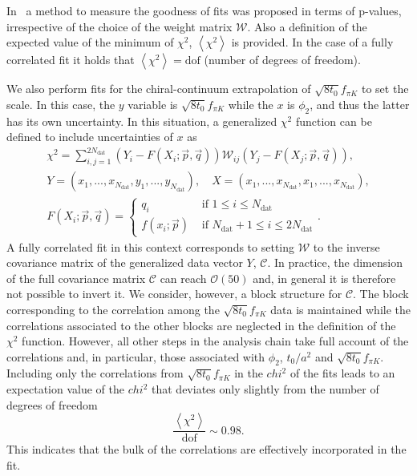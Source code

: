 In~\citep{Bruno:2022mfy} a method to measure the goodness of fits was proposed in terms of p-values, irrespective of the choice of the weight matrix $\mathcal{W}$. Also a definition of the expected value of the minimum of $\chi^2$, $\left<\chi^2\right>$ is provided. In the case of a fully correlated fit it holds that $\left<\chi^2\right>={\textrm{dof}}$ (number of degrees of freedom).

We also perform fits for the chiral-continuum extrapolation of $\sqrt{8t_0}f_{\pi K}$ to set the scale. In this case, the $y$ variable is $\sqrt{8t_0}f_{\pi K}$ while the $x$ is $\phi_2$, and thus the latter has its own uncertainty. In this situation, a generalized $\chi^2$ function can be defined to include uncertainties of $x$ as
\begin{gather}
\label{apex_chisq:eq:chisq_generalized}
\chi^2=\sum_{i,j=1}^{2N_{\textrm{dat}}}\left(Y_i-F(X_i;\vec{p},\vec{q})\right)\mathcal{W}_{ij}\left(Y_j-F(X_j;\vec{p},\vec{q})\right), \\
Y=(x_1,...,x_{N_{\textrm{dat}}},y_1,...,y_{N_{\textrm{dat}}}), \quad
X=(x_1,...,x_{N_{\textrm{dat}}},x_1,...,x_{N_{\textrm{dat}}}), \\
F(X_i;\vec{p},\vec{q})=\left\{\begin{matrix}
q_i & \textrm{ if $1\leq i\leq N_{\textrm{dat}}$} \\ 
f(x_i;\vec{p}) & \textrm{ if $N_{\textrm{dat}}+1\leq i\leq 2N_{\textrm{dat}}$}
\end{matrix}\right..
\end{gather}
A fully correlated fit in this context corresponds to setting $\mathcal{W}$ to the inverse covariance matrix of the generalized data vector $Y$, $\mathcal{C}$. In practice, the dimension of the full covariance matrix $\mathcal{C}$ can reach $\mathcal{O}(50)$ and, in general it is therefore not possible to invert it. We consider, however, a block structure for $\mathcal{C}$. The block corresponding to the correlation among  the $\sqrt{8t_0}f_{\pi K}$ data is maintained while the correlations associated to the other blocks are neglected in the definition of the $\chi^2$ function. However, all other steps in the analysis chain take full account  of the correlations and, in particular, those associated with $\phi_2$, $t_0/a^2$ and $\sqrt{8t_0}f_{\pi K}$. Including only the correlations from $\sqrt{8t_0}f_{\pi K}$ in the $chi^2$ of the fits leads to an expectation value of the $chi^2$ that deviates only slightly from the number of degrees of freedom
\begin{equation}
\frac{\left<\chi^2\right>}{{\textrm{dof}}}\sim0.98.
\end{equation}
This indicates that the bulk of the correlations are effectively incorporated in the fit.




